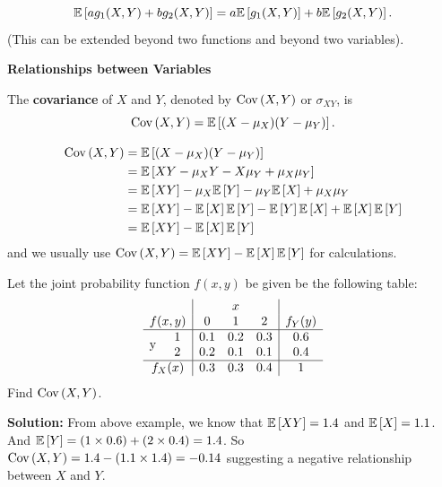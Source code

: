 \begin{theorem}
    \[\mathbb{E}\left[{ag_1(X, Y) + bg_2(X, Y)}\right] = a\mathbb{E}\left[{g_1(X, Y)}\right] + b\mathbb{E}\left[{g_2(X, Y)}\right].\]
(This can be extended beyond two functions and beyond two variables).
\end{theorem}

\textbf{Relationships between Variables}

\begin{definition}
    The \textbf{covariance} of $X$ and $Y$, denoted by $\operatorname{Cov}\left({X, Y}\right)$ or $\sigma_{XY}$, is
    \[\operatorname{Cov}\left({X, Y}\right) = \mathbb{E}\left[{(X - \mu_X)(Y - \mu_Y)}\right].\]
\end{definition}

\begin{note}
    \phantom{} \vspace{-3mm}
    \begin{align*}
        \operatorname{Cov}\left({X, Y}\right) &= \mathbb{E}\left[{(X - \mu_X)(Y - \mu_Y)}\right]   \\
                   &= \mathbb{E}\left[{XY - \mu_XY - X\mu_Y + \mu_X\mu_Y}\right]    \\
                   &= \mathbb{E}\left[{XY}\right] - \mu_X\mathbb{E}\left[{Y}\right] - \mu_Y\mathbb{E}\left[{X}\right] + \mu_X\mu_Y  \\
                   &= \mathbb{E}\left[{XY}\right] - \mathbb{E}\left[{X}\right]\mathbb{E}\left[{Y}\right] - \mathbb{E}\left[{Y}\right]\mathbb{E}\left[{X}\right] + \mathbb{E}\left[{X}\right]\mathbb{E}\left[{Y}\right]  \\
                   &= \mathbb{E}\left[{XY}\right] - \mathbb{E}\left[{X}\right]\mathbb{E}\left[{Y}\right]
    \end{align*}
    and we usually use $\operatorname{Cov}\left({X, Y}\right) = \mathbb{E}\left[{XY}\right] - \mathbb{E}\left[{X}\right]\mathbb{E}\left[{Y}\right]$ for calculations. 
\end{note}

\begin{example}
    Let the joint probability function $f(x,y)$ be given be the following table:
    \[
        \begin{array}{cc|ccc|c}
            & & \multicolumn{3}{c|}{x} & \\
            \multicolumn{2}{c|}{f(x,y)} & 0 & 1 & 2 & f_Y(y) \\
            \hline
            \multirow{2}{*}{y} 
              & 1 & 0.1 & 0.2 & 0.3 & 0.6 \\
              & 2 & 0.2 & 0.1 & 0.1 & 0.4 \\
            \hline
            \multicolumn{2}{c|}{f_X(x)} & 0.3 & 0.3 & 0.4 & 1
        \end{array}
    \]
    Find $\operatorname{Cov}\left({X,Y}\right)$.

    \textbf{Solution:} From above example, we know that $\mathbb{E}\left[{XY}\right] = 1.4$ and $\mathbb{E}\left[{X}\right] = 1.1$. \\
    And $\mathbb{E}\left[{Y}\right] = (1 \times 0.6) + (2 \times 0.4) = 1.4$. So $\operatorname{Cov}\left({X,Y}\right) = 1.4 - (1.1 \times 1.4) = -0.14$ suggesting a negative relationship between $X$ and $Y$.
\end{example}

